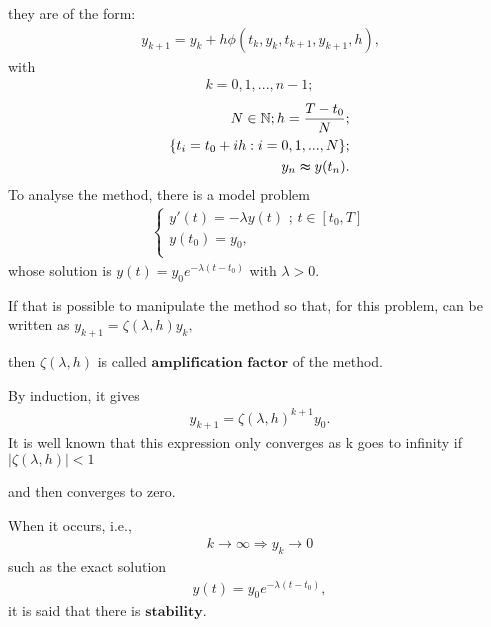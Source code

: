 \documentclass[letterpaper,10pt,english]{jupyterBook}
\begin{document}
\sphinxAtStartPar
they are of the form:
\begin{equation*}
\begin{split}
y_{k+1} = y_{k} + h \phi (t_{k},y_{k},t_{k+1},y_{k+1},h) \text{,}
\end{split}
\end{equation*}
\sphinxAtStartPar
with
\begin{equation*}
\begin{split}k = 0, 1, ..., n-1;\end{split}
\end{equation*}\begin{equation*}
\begin{split}
N \in \mathbb{N}; h = \frac{T-t_0}{N}; \\
\{t_i = t_0 + ih : i = 0, 1, ..., N\}; \\ 
y_n \thickapprox y(t_n) .
\end{split}
\end{equation*}
\sphinxAtStartPar
To analyse the method, there is a model problem
\begin{equation*}
\begin{split}
\begin{cases}
    y'(t) = - \lambda y(t) \text{ ; } t \in[t_0,T]\\ 
    y(t_0)=y_0,\\
\end{cases}
\end{split}
\end{equation*}
\sphinxAtStartPar
whose solution is \(y(t) = y_0 e^{-\lambda (t-t_0)}\)
with \(\lambda > 0.\)

\sphinxAtStartPar
If that is possible to manipulate the method so that, for this problem, can be written as \(y_{k+1} = \zeta(\lambda,h) y_k,\)

\sphinxAtStartPar
then \(\zeta(\lambda,h)\) is called \(\textbf{amplification factor}\) of the method.

\sphinxAtStartPar
By induction, it gives
\begin{equation*}
\begin{split}
y_{k+1} = \zeta(\lambda, h)^{k+1} y_0.
\end{split}
\end{equation*}
\sphinxAtStartPar
It is well known that this expression only converges as k goes to infinity if \( |\zeta(\lambda, h)| < 1\)

\sphinxAtStartPar
and then converges to zero.

\sphinxAtStartPar
When it occurs, i.e.,
\begin{equation*}
\begin{split}
    k \rightarrow \infty \Rightarrow y_k \rightarrow 0
\end{split}
\end{equation*}
\sphinxAtStartPar
such as the exact solution
\begin{equation*}
\begin{split}
    y(t) = y_0 e^{-\lambda (t-t_0)},
\end{split}
\end{equation*}
\sphinxAtStartPar
it is said that there is \(\textbf{stability}\).
\end{document}
